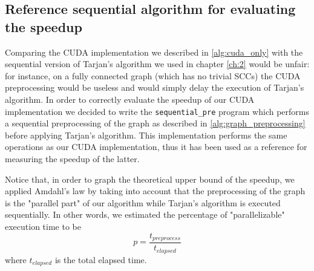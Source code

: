 \subsection{Reference sequential algorithm for evaluating the speedup}
\label{alg:sequential_pre}
Comparing the CUDA implementation we described in \ref{alg:cuda_only} with the sequential version of Tarjan's algorithm we used in chapter \ref{ch:2} would be unfair: for instance, on a fully connected graph (which has no trivial SCCs) the CUDA preprocessing would be useless and would simply delay the execution of Tarjan's algorithm. In order to correctly evaluate the speedup of our CUDA implementation we decided to write the \verb|sequential_pre| program which performs a sequential preprocessing of the graph as described in \ref{alg:graph_preprocessing} before applying Tarjan's algorithm. This implementation performs the same operations as our CUDA implementation, thus it has been used as a reference for measuring the speedup of the latter.

Notice that, in order to graph the theoretical upper bound of the speedup, we applied Amdahl's law by taking into account that the preprocessing of the graph is the "parallel part" of our algorithm while Tarjan's algorithm is executed sequentially. In other words, we estimated the percentage of "parallelizable" execution time to be
\begin{equation*}
  p = \frac{t_{preprocess}}{t_{elapsed}}
\end{equation*}
where $t_{elapsed}$ is the total elapsed time.

